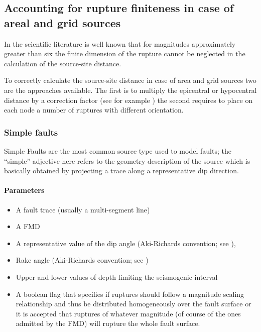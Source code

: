 \subsection{Accounting for rupture finiteness in case of areal and grid sources}
%
In the scientific literature is well known that for magnitudes approximately 
greater than six the finite dimension of the rupture cannot be neglected in 
the calculation of the source-site distance. 

To correctly calculate the source-site distance in case of area and grid sources 
two are the approaches available. The first is to multiply the epicentral or 
hypocentral distance by a correction factor (see for example \cite{harmsen2008})
the second requires to place on each node a number of ruptures with different 
orientation. 
%
\subsubsection{Simple faults}
%
Simple Faults are the most common source type used to model faults; the 
``simple'' adjective here refers to the geometry description of the source 
which is basically obtained by projecting a trace along a representative dip 
direction. 
%
\paragraph{Parameters}
%
\begin{itemize}
\item A fault trace (usually a multi-segment line) 
\item A FMD 
\item A representative value of the dip angle (Aki-Richards convention; see 
	\citet{aki2002}),
\item Rake angle (Aki-Richards convention; see \citet{aki2002}) 
\item Upper and lower values of depth limiting the seismogenic interval 
\item A boolean flag that specifies if ruptures should follow a magnitude scaling 
relationship and thus be distributed homogeneously over the fault surface or it is 
accepted that ruptures of whatever magnitude (of course of the ones admitted by 
the FMD) will rupture the whole fault surface.
\end{itemize}
%
